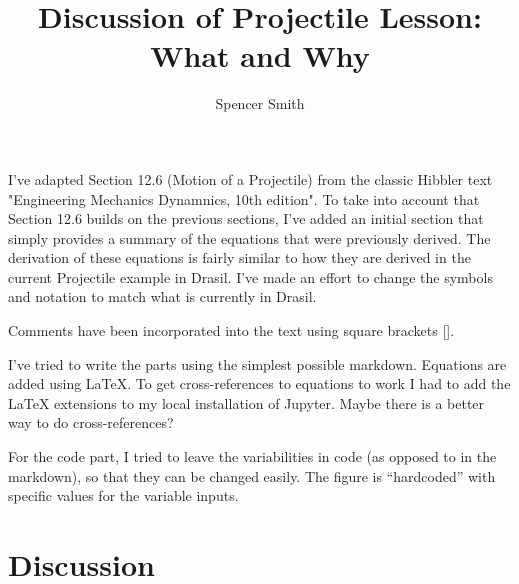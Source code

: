 \documentclass[12pt]{article}
\title{Discussion of Projectile Lesson: What and Why}
\author{Spencer Smith}
\begin{document}
\maketitle

I've adapted Section 12.6 (Motion of a Projectile) from the classic Hibbler text
"Engineering Mechanics Dynamnics, 10th edition". To take into account that
Section 12.6 builds on the previous sections, I've added an initial section that
simply provides a summary of the equations that were previously derived.  The
derivation of these equations is fairly similar to how they are derived in the
current Projectile example in Drasil.  I've made an effort to change the symbols
and notation to match what is currently in Drasil.

Comments have been incorporated into the text using square brackets [].

I've tried to write the parts using the simplest possible markdown.  Equations
are added using LaTeX.  To get cross-references to equations to work I had to
add the LaTeX extensions to my local installation of Jupyter.  Maybe there is a
better way to do cross-references?

For the code part, I tried to leave the variabilities in code (as opposed to in
the markdown), so that they can be changed easily.  The figure is ``hardcoded''
with specific values for the variable inputs.

\section {Discussion}
\end{document}
